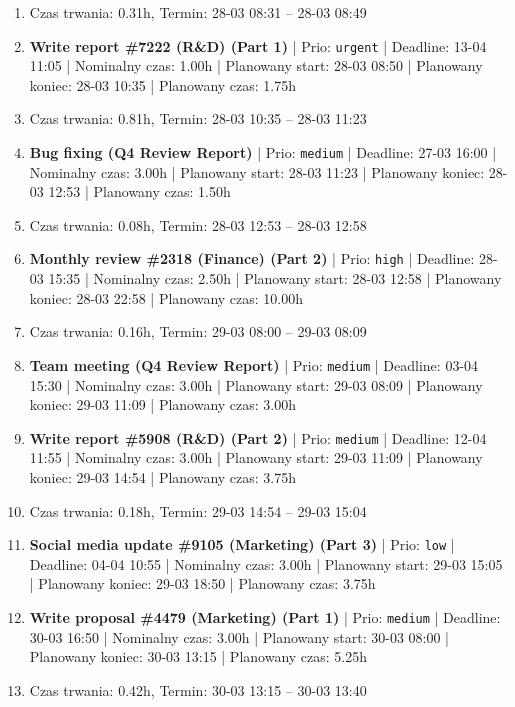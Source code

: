 {\begin{enumerate}
  \item [\textbf{PRZERWA}] Czas trwania: 0.31h, Termin: 28-03 08:31 -- 28-03 08:49
  \item [\textbf{14601}] \textbf{Write report \#7222 (R\&D) (Part 1)} | Prio: \texttt{urgent} | Deadline: 13-04 11:05 | Nominalny czas: 1.00h | Planowany start: 28-03 08:50 | Planowany koniec: 28-03 10:35 | Planowany czas: 1.75h
  \item [\textbf{PRZERWA}] Czas trwania: 0.81h, Termin: 28-03 10:35 -- 28-03 11:23
  \item [\textbf{14647}] \textbf{Bug fixing (Q4 Review Report)} | Prio: \texttt{medium} | Deadline: 27-03 16:00 | Nominalny czas: 3.00h | Planowany start: 28-03 11:23 | Planowany koniec: 28-03 12:53 | Planowany czas: 1.50h
  \item [\textbf{PRZERWA}] Czas trwania: 0.08h, Termin: 28-03 12:53 -- 28-03 12:58
  \item [\textbf{14618}] \textbf{Monthly review \#2318 (Finance) (Part 2)} | Prio: \texttt{high} | Deadline: 28-03 15:35 | Nominalny czas: 2.50h | Planowany start: 28-03 12:58 | Planowany koniec: 28-03 22:58 | Planowany czas: 10.00h
  \item [\textbf{PRZERWA}] Czas trwania: 0.16h, Termin: 29-03 08:00 -- 29-03 08:09
  \item [\textbf{14635}] \textbf{Team meeting (Q4 Review Report)} | Prio: \texttt{medium} | Deadline: 03-04 15:30 | Nominalny czas: 3.00h | Planowany start: 29-03 08:09 | Planowany koniec: 29-03 11:09 | Planowany czas: 3.00h
  \item [\textbf{14674}] \textbf{Write report \#5908 (R\&D) (Part 2)} | Prio: \texttt{medium} | Deadline: 12-04 11:55 | Nominalny czas: 3.00h | Planowany start: 29-03 11:09 | Planowany koniec: 29-03 14:54 | Planowany czas: 3.75h
  \item [\textbf{PRZERWA}] Czas trwania: 0.18h, Termin: 29-03 14:54 -- 29-03 15:04
  \item [\textbf{14698}] \textbf{Social media update \#9105 (Marketing) (Part 3)} | Prio: \texttt{low} | Deadline: 04-04 10:55 | Nominalny czas: 3.00h | Planowany start: 29-03 15:05 | Planowany koniec: 29-03 18:50 | Planowany czas: 3.75h
  \item [\textbf{14660}] \textbf{Write proposal \#4479 (Marketing) (Part 1)} | Prio: \texttt{medium} | Deadline: 30-03 16:50 | Nominalny czas: 3.00h | Planowany start: 30-03 08:00 | Planowany koniec: 30-03 13:15 | Planowany czas: 5.25h
  \item [\textbf{PRZERWA}] Czas trwania: 0.42h, Termin: 30-03 13:15 -- 30-03 13:40

\end{enumerate}}
